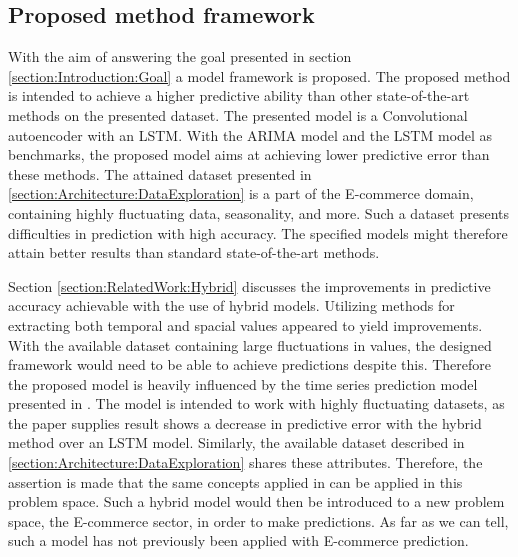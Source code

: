 \subsection{Proposed method framework}


With the aim of answering the goal presented in section \ref{section:Introduction:Goal} a model framework is proposed.
The proposed method is intended to achieve a higher predictive ability than other state-of-the-art methods on the presented dataset.
The presented model is a Convolutional autoencoder with an LSTM.
With the ARIMA model and the LSTM model as benchmarks, the proposed model aims at achieving lower predictive error than these methods.
The attained dataset presented in
\autoref{section:Architecture:DataExploration}
is a part of the E-commerce domain, containing highly fluctuating data, seasonality, and more.
Such a dataset presents difficulties in prediction with high accuracy. The specified models might therefore attain better results than standard state-of-the-art methods.

Section \ref{section:RelatedWork:Hybrid} discusses the improvements in predictive accuracy achievable with the use of hybrid models.
Utilizing methods for extracting both temporal and spacial values appeared to yield improvements.
With the available dataset containing large fluctuations in values, the designed framework would need to be able to achieve predictions despite this.
Therefore the proposed model is heavily influenced by the time series prediction model presented in \cite{Zhao2019}.
The model is intended to work with highly fluctuating datasets, as the paper supplies result shows a decrease in predictive error with the hybrid method over an LSTM model.
Similarly, the available dataset described in
\autoref{section:Architecture:DataExploration} shares these attributes.
Therefore, the assertion is made that the same concepts applied in \cite{Zhao2019} can be applied in this problem space.
Such a hybrid model would then be introduced to a new problem space, the E-commerce sector, in order to make predictions.
As far as we can tell, such a model has not previously been applied with E-commerce prediction.

